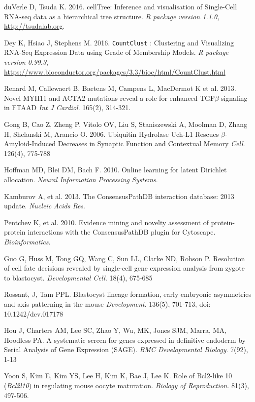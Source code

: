 \documentclass[10pt,letterpaper]{article}
\begin{document}
\begin{thebibliography}{9}
 duVerle D, Tsuda K. 2016.
 cellTree: Inference and visualisation of Single-Cell RNA-seq data as a hierarchical tree structure.
 \textit{R package version 1.1.0}, \url{http://tsudalab.org}.

 Dey K, Hsiao J, Stephens M. 2016.
{\tt CountClust} : Clustering and Visualizing RNA-Seq Expression Data using Grade of Membership Models.
 \textit{R package version 0.99.3}, \url{https://www.bioconductor.org/packages/3.3/bioc/html/CountClust.html}

 Renard M,  Callewaert B,  Baetens M,  Campens L,  MacDermot K et al. 2013.
 Novel MYH11 and ACTA2 mutations reveal a role for enhanced TGF$\beta$ signaling in FTAAD
 \textit{Int J Cardiol}. 165(2), 314-321.

 Gong B,  Cao Z,  Zheng P,  Vitolo OV,  Liu S,  Staniszewski A,  Moolman D,  Zhang H,  Shelanski M,  Arancio O. 2006.
 Ubiquitin Hydrolase Uch-L1 Rescues $\beta$-Amyloid-Induced Decreases in Synaptic Function and Contextual Memory
 \textit{Cell}. 126(4), 775-788

 Hoffman MD,  Blei DM,  Bach F. 2010.
 Online learning for latent Dirichlet allocation.
 \textit{Neural Information Processing Systems}.

 Kamburov A,  et al. 2013.
 The ConsensusPathDB interaction database: 2013 update.
 \textit{Nucleic Acids Res}.

 Pentchev K,  et al. 2010.
 Evidence mining and novelty assessment of protein-protein interactions with the ConsensusPathDB plugin for Cytoscape.
 \textit{Bioinformatics}.

Guo G, Huss M, Tong GQ, Wang C, Sun LL, Clarke ND, Robson P.
Resolution of cell fate decisions revealed by single-cell gene expression analysis from zygote to blastocyst. \textit{Developmental Cell}. 18(4), 675-685

Rossant, J, Tam PPL.
Blastocyst lineage formation, early embryonic asymmetries and axis patterning in the mouse
\textit{Development}. 136(5), 701-713, doi: 10.1242/dev.017178

Hou J, Charters AM, Lee SC, Zhao Y, Wu, MK, Jones SJM, Marra, MA, Hoodless PA.
A systematic screen for genes expressed in definitive endoderm by Serial Analysis of Gene Expression (SAGE).
\textit{BMC Developmental Biology}. 7(92), 1-13


Yoon S, Kim E, Kim YS, Lee H, Kim K, Bae J, Lee K.
Role of Bcl2-like 10 (\textit{Bcl2l10}) in regulating mouse oocyte maturation.
\textit{Biology of Reproduction}. 81(3), 497-506.


\end{thebibliography}
\end{document}

